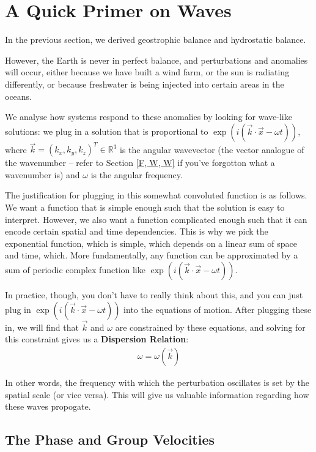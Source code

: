 \section{A Quick Primer on Waves}

In the previous section, we derived geostrophic balance and  hydrostatic balance.

However, the Earth is never in perfect balance, and perturbations and anomalies will occur, either because we have built a wind farm, or the sun is radiating differently, or because freshwater is being injected into certain areas in the oceans.

We analyse how systems respond to these anomalies by looking for wave-like solutions: we plug in a solution that is proportional to $\exp(i(\vec{k}\cdot\vec{x}-\omega t))$, where $\vec{k}=(k_x,k_y,k_z)^T\in\mathbb{R}^3$ is the angular wavevector (the vector analogue of the wavenumber – refer to Section \ref{F, W, W} if you've forgotton what a wavenumber is) and $\omega$ is the angular frequency.

The justification for plugging in this somewhat convoluted function is as follows. We want a function that is simple enough such that the solution is easy to interpret. However, we also want a function complicated enough such that it can encode certain spatial and time dependencies. This is why we pick the exponential function, which is simple, which depends on a linear sum of space and time, which. More fundamentally, any function can be approximated by a sum of periodic complex function like $\exp(i(\vec{k}\cdot\vec{x}-\omega t))$.

In practice, though, you don't have to really think about this, and you can just plug in $\exp(i(\vec{k}\cdot\vec{x}-\omega t))$ into the equations of motion. After plugging these in, we will find that $\vec{k}$ and $\omega$ are constrained by these equations, and solving for this constraint gives us a \textbf{Dispersion Relation}:
\begin{align*}
    \omega=\omega(\vec{k})
\end{align*}

In other words, the frequency with which the perturbation oscillates is set by the spatial scale (or vice versa). This will give us valuable information regarding how these waves propogate.

\subsection{The Phase and Group Velocities}

